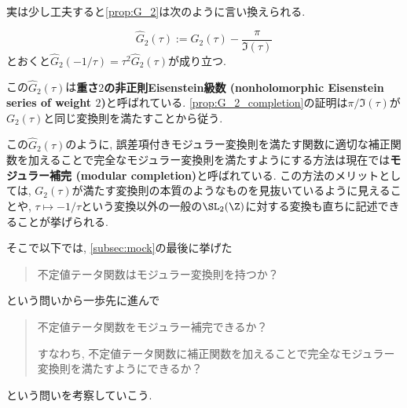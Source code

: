 \documentclass[11pt,b5paper,oneside,lualatex]{ltjsarticle} %
\numberwithin{equation}{section} %
\begin{document}
実は少し工夫すると\cref{prop:G_2}は次のように言い換えられる. 

\begin{prop}
	\label{prop:G_2_completion}
	\[
	\widehat{G}_2 (\tau) := G_2(\tau) - \frac{\pi }{\Im (\tau)}
	\]
	とおくと$ \widehat{G}_2 (-1/\tau) = \tau^2 \widehat{G}_2 (\tau) $が成り立つ.
\end{prop}

この$ \widehat{G}_2 (\tau) $は\textbf{重さ$ 2 $の非正則Eisenstein級数 (nonholomorphic Eisenstein series of weight $ 2 $)}と呼ばれている. 
\cref{prop:G_2_completion}の証明は$ \pi / \Im (\tau) $が$ G_2(\tau) $と同じ変換則を満たすことから従う. 

この$ \widehat{G}_2 (\tau) $のように, 誤差項付きモジュラー変換則を満たす関数に適切な補正関数を加えることで完全なモジュラー変換則を満たすようにする方法は現在では\textbf{モジュラー補完 (modular completion)}と呼ばれている. 
この方法のメリットとしては, $ G_2(\tau) $が満たす変換則の本質のようなものを見抜いているように見えることや, $ \tau \mapsto -1/\tau $という変換以外の一般の$ \SL_2(\Z) $に対する変換も直ちに記述できることが挙げられる. 

そこで以下では, \cref{subsec:mock}の最後に挙げた
\begin{quote}
	\centering
	不定値テータ関数はモジュラー変換則を持つか？
\end{quote}
という問いから一歩先に進んで
\begin{quote}
	\centering
	不定値テータ関数をモジュラー補完できるか？
	
	すなわち, 不定値テータ関数に補正関数を加えることで完全なモジュラー変換則を満たすようにできるか？
\end{quote}
という問いを考察していこう. 
\end{document}
